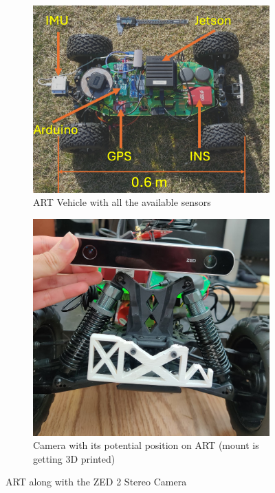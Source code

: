 \documentclass{article}
\begin{document}
\begin{figure}[htbp]
  \centering
  \begin{subfigure}[b]{0.45\textwidth}
    \centering
    \includegraphics[width=\linewidth]{./images/art.png}
    \caption{ART Vehicle with all the available sensors}
    \label{fig:art}
  \end{subfigure}
  \hfill
  \begin{subfigure}[b]{0.45\textwidth}
    \centering
    \includegraphics[width=\linewidth]{./images/camera.png}
    \caption{Camera with its potential position on ART (mount is getting 3D printed)}
    \label{fig:zed_2}
  \end{subfigure}
  \caption{ART along with the ZED 2 Stereo Camera}
  \label{fig:figure}
\end{figure}
\end{document}
